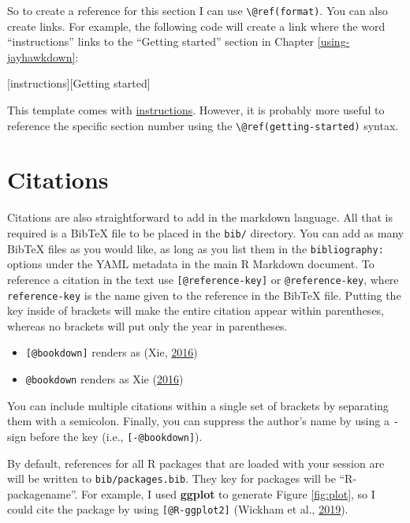 \documentclass[12pt,english]{kuthesis}
\providecommand{\tightlist}{%
  \setlength{\itemsep}{0pt}\setlength{\parskip}{0pt}}
\newenvironment{Shaded}{\begin{snugshade}}{\end{snugshade}}
\newcommand{\OtherTok}[1]{\textcolor[rgb]{0.56,0.35,0.01}{#1}}
\begin{document}
So to create a reference for this section I can use \texttt{\textbackslash{}@ref(format)}. You can also create links. For example, the following code will create a link where the word ``instructions'' links to the ``Getting started'' section in Chapter \ref{using-jayhawkdown}:

\begin{Shaded}
\begin{Highlighting}[]
\OtherTok{[instructions][Getting started]}
\end{Highlighting}
\end{Shaded}

This template comes with \protect\hyperlink{getting-started}{instructions}. However, it is probably more useful to reference the specific section number using the \texttt{\textbackslash{}@ref(getting-started)} syntax.

\hypertarget{citations}{%
\section{Citations}\label{citations}}

Citations are also straightforward to add in the markdown language. All that is required is a BibTeX file to be placed in the \texttt{bib/} directory. You can add as many BibTeX files as you would like, as long as you list them in the \texttt{bibliography:} options under the YAML metadata in the main R Markdown document. To reference a citation in the text use \texttt{{[}@reference-key{]}} or \texttt{@reference-key}, where \texttt{reference-key} is the name given to the reference in the BibTeX file. Putting the key inside of brackets will make the entire citation appear within parentheses, whereas no brackets will put only the year in parentheses.

\begin{itemize}
\tightlist
\item
  \texttt{{[}@bookdown{]}} renders as (Xie, \protect\hyperlink{ref-bookdown}{2016})
\item
  \texttt{@bookdown} renders as Xie (\protect\hyperlink{ref-bookdown}{2016})
\end{itemize}

You can include multiple citations within a single set of brackets by separating them with a semicolon. Finally, you can suppress the author's name by using a \texttt{-} sign before the key (i.e., \texttt{{[}-@bookdown{]}}).

By default, references for all R packages that are loaded with your session are will be written to \texttt{bib/packages.bib}. They key for packages will be ``R-packagename''. For example, I used \textbf{ggplot} to generate Figure \ref{fig:plot}, so I could cite the package by using \texttt{{[}@R-ggplot2{]}} (Wickham et al., \protect\hyperlink{ref-R-ggplot2}{2019}).
\end{document}
